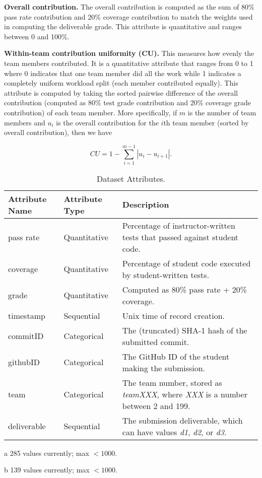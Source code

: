 \documentclass[../manifest.tex]{subfiles}
\begin{document}
\textbf{Overall contribution.} The overall contribution is computed as the sum of 80\% pass rate contribution and 20\% coverage contribution to match the weights used in computing the deliverable grade. This attribute is quantitative and ranges between 0 and 100\%.

\textbf{Within-team contribution uniformity (CU).} This measures how evenly the team members contributed. It is a quantitative attribute that ranges from 0 to 1 where 0 indicates that one team member did all the work while 1 indicates a completely uniform workload split (each member contributed equally). This attribute is computed by taking the sorted pairwise difference of the overall contribution (computed as 80\% test grade contribution and 20\% coverage grade contribution) of each team member. More specifically, if $m$ is the number of team members and $u_i$ is the overall contribution for the $i$th team member (sorted by overall contribution), then we have

\begin{equation}
  \label{eq:con-uniform}
  CU = 1-\sum_{i=1}^{m-1} |u_i - u_{i+1}|.
\end{equation}


\begin{table*}[t]
  \centering
  \begin{threeparttable}
      \caption{Dataset Attributes.}
      \label{tab:attributes}
  \begin{tabular*}{\textwidth}{lll}
    \hline
    \textbf{Attribute Name} & \textbf{Attribute Type} & \textbf{Description} \\
    \hline
    pass rate     & Quantitative & Percentage of instructor-written tests that passed against student code. \\
    coverage  & Quantitative & Percentage of student code executed by student-written tests. \\
    grade     & Quantitative & Computed as 80\% pass rate + 20\% coverage. \\
    timestamp      & Sequential   & Unix time of record creation. \\
    commitID      & Categorical  & The (truncated) SHA-1 hash of the submitted commit. \\
    githubID      & Categorical\tnote{a}  & The GitHub ID of the student making the submission. \\
    team           & Categorical\tnote{b}  & The team number, stored as \textit{teamXXX}, where \textit{XXX} is a number between 2 and 199. \\
    deliverable    & Sequential   & The submission deliverable, which can have values \textit{d1}, \textit{d2}, or \textit{d3}. \\
    \hline
  \end{tabular*}
  \begin{tablenotes}\footnotesize
    \item [a] 285 values currently; max $<1000$.
    \item [b] 139 values currently; max $<1000$.
\end{tablenotes}
\end{threeparttable}
\end{table*}
\end{document}
